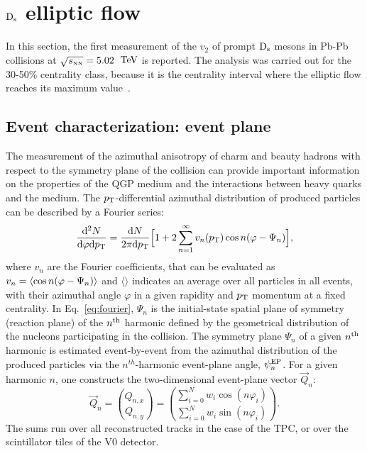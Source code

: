 \section{${\rm D_s}$ elliptic flow}
In this section, the first measurement of the $v_2$ of prompt
${\rm D_s}$ mesons in Pb-Pb collisions at 
$\sqrt{s_{\rm \scriptscriptstyle NN}} = 5.02$~$\mathrm{TeV}$ is reported. The analysis was carried 
out for the 30-50\% centrality class, because it is the centrality
interval where the elliptic flow reaches its maximum value~\cite{Adam:2016izf}. 

\subsection{Event characterization: event plane}
\label{sec:EventPlane}
The measurement of the azimuthal anisotropy of charm and beauty hadrons
with respect to the symmetry plane of the collision can provide important information on the properties of the QGP medium 
and the interactions between heavy quarks and the medium.
The $p_{\rm T}$-differential azimuthal distribution of produced particles can be described by a Fourier series:
\begin{equation}
\label{eq:fourier}
\frac{{\rm d}^2N}{{\rm d} \varphi {\rm d}p_{\rm T}} =  \frac{{\rm d}N}{2\pi {\rm d}p_{\rm T}} \Big [ 1+ 2 \sum_{n=1}^{\infty} v_n(p_{\rm T}) \,{\rm cos} \,n(\varphi- \Psi_n)\Big ], 
\end{equation}
where $v_n$ are the Fourier coefficients, that can be evaluated as 
$v_n = \langle {\rm cos} \, n(\varphi - \Psi_n)\rangle$ and $\langle \rangle$ indicates an average over 
 all particles in all events, with their azimuthal angle $\varphi$ in a given rapidity and $p_{\rm T}$ 
 momentum at a fixed centrality. In Eq.~\ref{eq:fourier},
$\Psi_n$ is the initial-state spatial plane of symmetry (reaction plane) of
 the $n^{\rm th}$ harmonic defined by the geometrical distribution of the nucleons participating in the collision.
The symmetry plane $\Psi_n$ of a given $n^{\rm th}$ harmonic is estimated 
 event-by-event from the azimuthal distribution of the produced particles
via the $n^{th}$-harmonic event-plane angle, $\psi_n^{\rm EP}$.
For a given harmonic $n$, one constructs the two-dimensional event-plane 
vector $\vec{Q}_n$:
\begin{equation}
\label{eq:qvector}
 \vec{Q}_n= {Q_{n,x} \choose Q_{n,y}} = {\sum_{i=0}^{N} w_i \cos (n\varphi_i) \choose \sum_{i=0}^{N} w_i \sin (n\varphi_i)}.
\end{equation}
The sums run over all reconstructed tracks in the case 
of the TPC, or over the scintillator tiles of the V0 detector.
